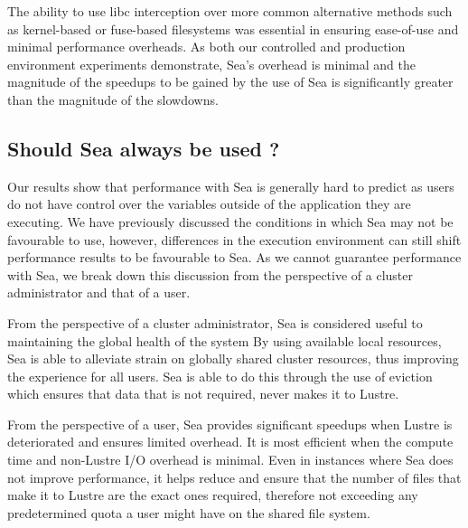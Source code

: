     The ability to use libc interception over more common alternative methods
    such as kernel-based or fuse-based filesystems was essential in ensuring
    ease-of-use and minimal performance overheads. As both our controlled and production
    environment experiments demonstrate, Sea's overhead is minimal and the magnitude of the
    speedups to be gained by the use of Sea is significantly greater than the magnitude of the
    slowdowns.
    
    \subsection{Should Sea always be used ?}
    
    Our results show that performance with Sea is generally hard to predict as users do not have control
    over the variables outside of the application they are executing. We have previously discussed the
    conditions in which Sea may not be favourable to use, however, differences in the execution environment
    can still shift performance results to be favourable to Sea. As we cannot guarantee performance with
    Sea, we break down this discussion from the perspective of a cluster administrator and that of a user.

    From the perspective of a cluster administrator, Sea is considered useful to
    maintaining the global health of the system By using available local
    resources, Sea is able to alleviate strain on globally shared cluster
    resources, thus improving the experience for all users. Sea is able to do
    this through the use of eviction which ensures that data that is not
    required, never makes it to Lustre.


    From the perspective of a user, Sea provides significant speedups when
    Lustre is deteriorated and ensures limited overhead. It is most efficient
    when the compute time and non-Lustre I/O overhead is minimal. Even in
    instances where Sea does not improve performance, it helps reduce and ensure
    that the number of files that make it to Lustre are the exact ones required,
    therefore not exceeding any predetermined quota a user might have on the
    shared file system. 
    
    
    
    
    
    
